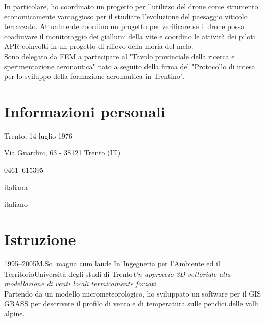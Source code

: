 \documentclass{curriculum}
\begin{document}
\begin{description}[style= unboxed, leftmargin= 6 pt, topsep= -3 pt, parsep= 3 pt, itemsep= 2pt]
     In particolare, ho coordinato un progetto per l'utilizzo del drone come strumento economicamente vantaggioso per il studiare l'evoluzione del paesaggio viticolo terrazzato. Attualmente coordino un progetto per verificare se il drone possa coadiuvare il monitoraggio dei giallumi della vite e coordino le attività dei piloti APR coinvolti in un progetto di rilievo della moria del melo.\\
     Sono delegato da FEM a partecipare al "Tavolo provinciale della ricerca e sperimentazione aeronautica" nato a seguito della firma del "Protocollo di intesa per lo sviluppo della formazione aeronautica in Trentino".
    \end{description}
    
    \newpage
    \pagestyle{normalpage}
    
    \section{Informazioni personali}
    \begin{description}[ labelindent=1in ,labelwidth=2cm, leftmargin =! , itemindent = 0pt, style = sameline]
        \item[Luogo e data di nascita:] Trento, 14 luglio 1976
        \item[Indirizzo:] Via Guardini, 63 - 38121 Trento (IT)
        \item[Telefono:] 0461~615395
        \item[Nazionalità:] italiana
        \item[Madrelingua:] italiano
    \end{description}
    
    \section{Istruzione}
    \begin{entrylist}
    \entry
        {1995--2005}{M.Sc. magna cum laude {\normalfont In Ingegneria per l'Ambiente ed il Territorio}}{Università degli studi di Trento}{\emph{Un approccio 3D vettoriale alla modellazione di venti locali termicamente forzati.}\hfill\vspace{2pt}\\
        Partendo da un modello micrometeorologico, ho sviluppato un software per il GIS GRASS per descrivere il profilo di vento e di temperatura sulle pendici delle valli alpine.}
    \end{entrylist}
    
\end{document}
